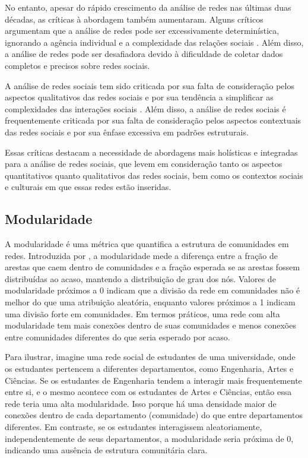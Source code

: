 No entanto, apesar do rápido crescimento da análise de redes nas últimas duas décadas, as críticas à abordagem também aumentaram. Alguns críticos argumentam que a análise de redes pode ser excessivamente determinística, ignorando a agência individual e a complexidade das relações sociais \cite{1991_Scott}. Além disso, a análise de redes pode ser desafiadora devido à dificuldade de coletar dados completos e precisos sobre redes sociais.

A análise de redes sociais tem sido criticada por sua falta de consideração pelos aspectos qualitativos das redes sociais e por sua tendência a simplificar as complexidades das interações sociais \cite{2013_Gruzd}. Além disso, a análise de redes sociais é frequentemente criticada por sua falta de consideração pelos aspectos contextuais das redes sociais e por sua ênfase excessiva em padrões estruturais.

Essas críticas destacam a necessidade de abordagens mais holísticas e integradas para a análise de redes sociais, que levem em consideração tanto os aspectos quantitativos quanto qualitativos das redes sociais, bem como os contextos sociais e culturais em que essas redes estão inseridas.


\subsection*{Modularidade}

A modularidade é uma métrica que quantifica a estrutura de comunidades em redes. Introduzida por \cite{2004_Newman}, a modularidade mede a diferença entre a fração de arestas que caem dentro de comunidades e a fração esperada se as arestas fossem distribuídas ao acaso, mantendo a distribuição de grau dos nós. Valores de modularidade próximos a 0 indicam que a divisão da rede em comunidades não é melhor do que uma atribuição aleatória, enquanto valores próximos a 1 indicam uma divisão forte em comunidades. Em termos práticos, uma rede com alta modularidade tem mais conexões dentro de suas comunidades e menos conexões entre comunidades diferentes do que seria esperado por acaso.

Para ilustrar, imagine uma rede social de estudantes de uma universidade, onde os estudantes pertencem a diferentes departamentos, como Engenharia, Artes e Ciências. Se os estudantes de Engenharia tendem a interagir mais frequentemente entre si, e o mesmo acontece com os estudantes de Artes e Ciências, então essa rede teria uma alta modularidade. Isso porque há uma densidade maior de conexões dentro de cada departamento (comunidade) do que entre departamentos diferentes. Em contraste, se os estudantes interagissem aleatoriamente, independentemente de seus departamentos, a modularidade seria próxima de 0, indicando uma ausência de estrutura comunitária clara.

